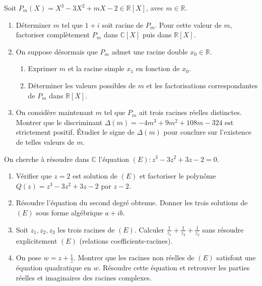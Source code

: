 \documentclass[11pt]{article}
\begin{document}
\begin{exercice}
Soit $P_m(X) = X^3 - 3X^2 + mX - 2 \in \mathbb{R}[X]$, avec $m \in \mathbb{R}$.
\begin{enumerate}
    \item Déterminer $m$ tel que $1+i$ soit racine de $P_m$. Pour cette valeur de $m$, factoriser complètement $P_m$ dans $\mathbb{C}[X]$ puis dans $\mathbb{R}[X]$.
    \item On suppose désormais que $P_m$ admet une racine double $x_0 \in \mathbb{R}$. 
    \begin{enumerate}
        \item Exprimer $m$ et la racine simple $x_1$ en fonction de $x_0$.
        \item Déterminer les valeurs possibles de $m$ et les factorisations correspondantes de $P_m$ dans $\mathbb{R}[X]$.
    \end{enumerate}
    \item On considère maintenant $m$ tel que $P_m$ ait trois racines réelles distinctes. 
    Montrer que le discriminant $\Delta(m) = -4m^3 + 9m^2 + 108m - 324$ est strictement positif. 
    Étudier le signe de $\Delta(m)$ pour conclure sur l'existence de telles valeurs de $m$.
\end{enumerate}
\end{exercice}

\begin{exercice}
On cherche à résoudre dans $\mathbb{C}$ l'équation $(E) : z^3 - 3z^2 + 3z - 2 = 0$.
\begin{enumerate}
    \item Vérifier que $z=2$ est solution de $(E)$ et factoriser le polynôme $Q(z)=z^3-3z^2+3z-2$ par $z-2$.
    \item Résoudre l'équation du second degré obtenue. Donner les trois solutions de $(E)$ sous forme algébrique $a+ib$.
    \item Soit $z_1, z_2, z_3$ les trois racines de $(E)$. Calculer $\frac{1}{z_1} + \frac{1}{z_2} + \frac{1}{z_3}$ sans résoudre explicitement $(E)$ (relations coefficients-racines).
    \item On pose $w = z + \frac{1}{z}$. Montrer que les racines non réelles de $(E)$ satisfont une équation quadratique en $w$. Résoudre cette équation et retrouver les parties réelles et imaginaires des racines complexes.
\end{enumerate}
\end{exercice}
\end{document}

